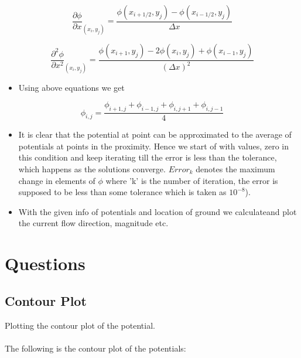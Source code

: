 \documentclass[11pt, a4paper]{article}
\begin{document}
    \begin{equation}
    \frac{\partial \phi}{\partial x}_{(x_i,y_j)} = \frac{\phi(x_{i+1/2},y_j) - \phi(x_{i-1/2},y_j)}{\Delta x}
     \end{equation}
    
    \begin{equation}
    \frac{\partial^{2} \phi}{\partial x^{2}}_{(x_i,y_j)} = \frac{\phi(x_{i+1},y_j) -2\phi(x_i,y_j)+ \phi(x_{i-1},y_j)}{(\Delta x)^{2}}
     \end{equation}
    
    \begin{itemize}
    \item
      Using above equations we get
    \end{itemize}
    
    \begin{equation}
            \phi_{i,j} = \frac{\phi_{i+1,j} + \phi_{i-1,j} + \phi_{i,j+1} + \phi_{i,j-1}}{4} 
    \end{equation}
    
    
    \begin{itemize}  %
    	\item
      	It is clear that the potential at point can be approximated to the average of potentials at points in the proximity. Hence we start of with values, zero in this condition and keep iterating till the error is less than the tolerance, which happens as the solutions converge. \(Error_k\) denotes the maximum change in elements of \(\phi\) where 'k' is the number of iteration, the error is supposed to be less than some tolerance which is taken as \(10^{-8}\)).

    \item
With the given info of potentials and location of ground we calculateand plot the current flow direction, magnitude etc.
  \end{itemize}
    
	\section{Questions}  %
	   \subsection{Contour Plot}
          Plotting the contour plot of the potential.\\
           \\The following is the contour plot of the potentials:
         
\end{document}
